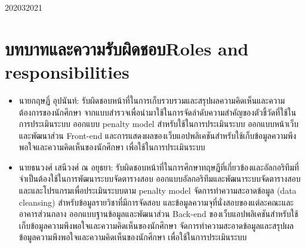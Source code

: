 \begin{plan}{7}{2020}{3}{2021}
\end{plan}


\section{\ifcpe บทบาทและความรับผิดชอบ\else Roles and responsibilities\fi}
\begin{itemize}
    \item นายกฤษฏิ์ อุปนันท์: รับผิดชอบหน้าที่ในการเก็บรวบรวมและสรุปผลความคิดเห็นและความต้องการของนักศึกษา
    จากแบบสำรวจเพื่อนำมาใช้ในการจัดลำดับความสำคัญของตัวชี้วัดที่ใช้ในการประเมินระบบ ออกแบบ penalty model สำหรับใช้ในการประเมินระบบ 
    ออกแบบหน้าเว็บและพัฒนาส่วน Front-end และการแสดงผลของเว็บแอปพลิเคชันสำหรับใช้เก็บข้อมูลความพึงพอใจและความคิดเห็นของนักศึกษา เพื่อใช้ในการประเมินระบบ
    \item นายธนวงศ์ เสนีวงศ์ ณ อยุธยา: รับผิดชอบหน้าที่ในการศึกษาทฤษฎีที่เกี่ยวข้องและอัลกอริทึมที่จำเป็นต้องใช้ในการพัฒนาระบบจัดตารางสอบ 
    ออกแบบอัลกอริทึมและพัฒนาระบบจัดตารางสอบและและโปรแกรมเพื่อประเมินระบบตาม penalty model 
    จัดการทำความสะอาดข้อมูล (data cleansing) สำหรับข้อมูลรายวิชาที่มีการจัดสอบ และข้อมูลความจุที่นั่งสอบของแต่ละคณะและอาคารส่วนกลาง
    ออกแบบฐานข้อมูลและพัฒนาส่วน Back-end ของเว็บแอปพลิเคชันสำหรับใช้เก็บข้อมูลความพึงพอใจและความคิดเห็นของนักศึกษา
    จัดการทำความสะอาดข้อมูลและสรุปผล ข้อมูลความพึงพอใจและความคิดเห็นของนักศึกษา เพื่อใช้ในการประเมินระบบ
\end{itemize}

